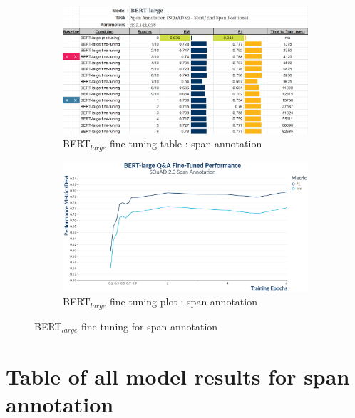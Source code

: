 \begin{figure}[!h]
	\centering
	\begin{subfigure}{0.95\textwidth}%
		\centering
		\includegraphics[width=\linewidth]{images/span/BERT_Large_Training.png}%
		\caption{BERT$_{large}$ fine-tuning table : span annotation}
	\end{subfigure}%
	
	\vspace*{8pt}%
	
	\begin{subfigure}{0.96\textwidth}%
		\centering
		\includegraphics[width=\linewidth]{images/QnA_BERT_Training_Performance_plot.png}%
		\caption{BERT$_{large}$ fine-tuning plot : span annotation}
	\end{subfigure}%
	\caption{\label{apdx:BERT_fine_tuning_span_annotation}BERT$_{large}$ fine-tuning for span annotation}
\end{figure}

\newpage
\section{Table of all model results for span annotation}
\label{apdx:span_annotation_all_results}


